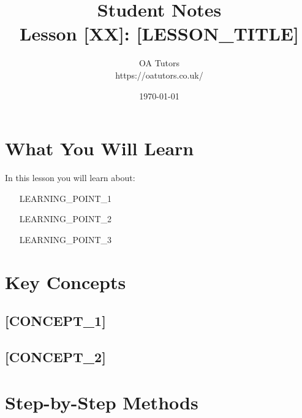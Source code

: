 \documentclass[a4paper,12pt]{article}
\begin{document}
\title{\textcolor{oablue}{\Huge Student Notes} \\ 
       \textcolor{oablue}{\Large Lesson [XX]: [LESSON_TITLE]}}
\author{\textcolor{oablue}{OA Tutors} \\ 
        \textcolor{oagray}{https://oatutors.co.uk/}}
\date{\textcolor{oagray}{\today}}

\maketitle

\section{What You Will Learn}
In this lesson you will learn about:
\begin{itemize}
    \item [LEARNING_POINT_1]
    \item [LEARNING_POINT_2]
    \item [LEARNING_POINT_3]
\end{itemize}

\section{Key Concepts}

\subsection{[CONCEPT_1]}
\begin{keypoint}
\end{keypoint}

\begin{example}
[EXAMPLE_1]
\end{example}

\subsection{[CONCEPT_2]}
\begin{keypoint}
\end{keypoint}

\begin{example}
[EXAMPLE_2]
\end{example}

\section{Step-by-Step Methods}
\end{document}
